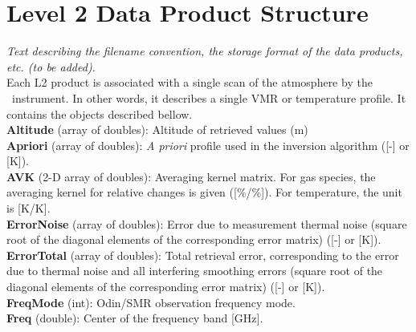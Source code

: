 \chapter{Level 2 Data Product Structure}
\label{chapter:L2_structure}

\textit{Text describing the filename convention, the storage format of the data products, etc. (to be added).} \\

Each L2 product is associated with a single scan of the atmosphere by the \smr\ instrument. In other words, it describes a single VMR or temperature profile. It contains the objects described bellow. \\


\textbf{Altitude} (array of doubles): Altitude of retrieved values (m) \\

\textbf{Apriori} (array of doubles): \textit{A priori} profile used in the inversion algorithm ([-] or [K]). \\

\textbf{AVK} (2-D array of doubles): Averaging kernel matrix. For gas species, the averaging kernel for relative changes is given ([\%/\%]). For temperature, the unit is [K/K]. \\

\textbf{ErrorNoise} (array of doubles): Error due to measurement thermal noise (square root of the diagonal elements of the corresponding error matrix) ([-] or [K]). \\

\textbf{ErrorTotal} (array of doubles): Total retrieval error, corresponding to the error due to thermal noise and all interfering smoothing errors (square root of the diagonal elements of the corresponding error matrix) ([-] or [K]). \\

\textbf{FreqMode} (int): Odin/SMR observation frequency mode. \\ %

\textbf{Freq} (double): Center of the frequency band [GHz]. \\ %

